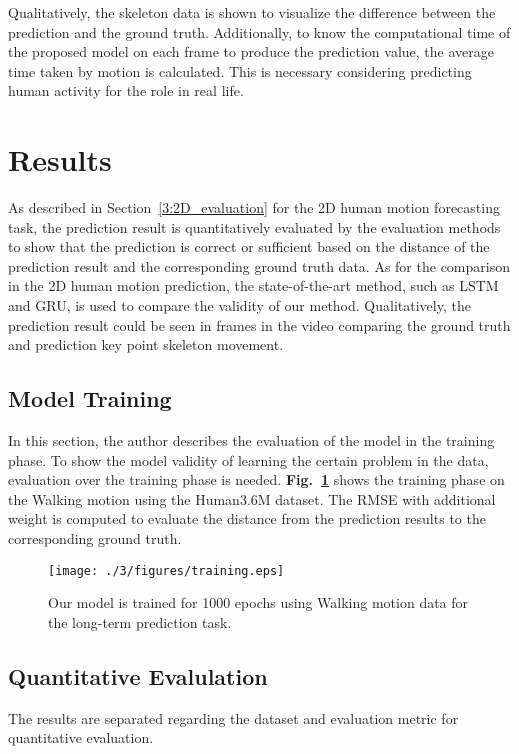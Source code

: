 Qualitatively, the skeleton data is shown to visualize the difference between the prediction and the ground truth.
Additionally, to know the computational time of the proposed model on each frame to produce the prediction value, the average time taken by motion is calculated.
This is necessary considering predicting human activity for the role in real life.

\section{Results}
As described in Section~\ref{3:2D_evaluation} for the 2D human motion forecasting task, the prediction result is quantitatively evaluated by the evaluation methods to show that the prediction is correct or sufficient based on the distance of the prediction result and the corresponding ground truth data. As for the comparison in the 2D human motion prediction, the state-of-the-art method, such as LSTM and GRU, is used to compare the validity of our method.
Qualitatively, the prediction result could be seen in frames in the video comparing the ground truth and prediction key point skeleton movement.

\subsection{Model Training}
In this section, the author describes the evaluation of the model in the training phase. To show the model validity of learning the certain problem in the data, evaluation over the training phase is needed. \textbf{Fig.~\ref{fig:2D_training_walking_long}} shows the training phase on the Walking motion using the Human3.6M dataset. The RMSE with additional weight is computed to evaluate the distance from the prediction results to the corresponding ground truth.

\begin{figure}
    \centering
    \texttt{[image: ./3/figures/training.eps]}
    \caption{
        Our model is trained for 1000 epochs using Walking motion data for the long-term prediction task.
    }
    \label{fig:2D_training_walking_long}
\end{figure}


\subsection{Quantitative Evalulation}\label{4:2Dquantitative}
The results are separated regarding the dataset and evaluation metric for quantitative evaluation.
